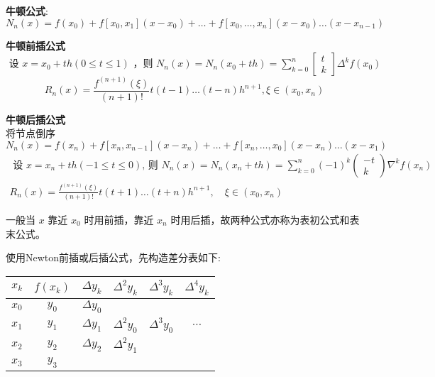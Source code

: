 \textbf{牛顿公式}:\\
$N_{n}(x)=f\left(x_{0}\right)+f\left[x_{0}, x_{1}\right]\left(x-x_{0}\right)+\ldots+f\left[x_{0}, \ldots, x_{n}\right]\left(x-x_{0}\right) \ldots\left(x-x_{n-1}\right)$

\textbf{牛顿前插公式}\\
$
\text { 设 } x=x_{0}+t h(0 \leq t \leq 1) \text { ，则 } N_{n}(x)=N_{n}\left(x_{0}+t h\right)=\sum\limits_{k=0}^{n}\left[\begin{array}{l}
t \\
k
\end{array}\right] \Delta^{k} f\left(x_{0}\right)
$
$$
R_{n}(x)=\frac{f^{(n+1)}(\xi)}{(n+1) !} t(t-1) \ldots(t-n) h^{n+1}, \xi \in\left(x_{0}, x_{n}\right)
$$

\textbf{牛顿后插公式}\\
将节点倒序\\
$N_{n}(x)=f\left(x_{n}\right)+f\left[x_{n}, x_{n-1}\right]\left(x-x_{n}\right)+\ldots+f\left[x_{n}, \ldots, x_{0}\right]\left(x-x_{n}\right) \ldots\left(x-x_{1}\right)$
$$
\begin{gathered}
\text { 设 } x=x_{n}+t h(-1 \leq t \leq 0) \text {, 则 } N_{n}(x)=N_{n}\left(x_{n}+t h\right)=\sum_{k=0}^{n}(-1)^{k}\left(\begin{array}{c}
-t \\
k
\end{array}\right) \nabla^{k} f\left(x_{n}\right) \\
R_{n}(x)=\frac{f^{(n+1)}(\xi)}{(n+1) !} t(t+1) \ldots(t+n) h^{n+1}, \quad \xi \in\left(x_{0}, x_{n}\right)
\end{gathered}
$$

\begin{note}
  一般当 $x$ 靠近 $x_{0}$ 时用前插，靠近 $x_{n}$ 时用后插，故两种公式亦称为表初公式和表末公式。
\end{note}

使用Newton前插或后插公式，先构造差分表如下:
\begin{table}[htbp]
  \centering
  \begin{tabular}{|cccccc|}
    \hline$x_{k}$ & $f\left(x_{k}\right)$ & $\Delta y_{k}$ & $\Delta^{2} y_{k}$ & $\Delta^{3} y_{k}$ & $\Delta^{4} y_{k}$ \\
    \hline$x_{0}$ & $y_{0}$ & $\Delta y_{0}$ & & & \\
    $x_{1}$ & $y_{1}$ & $\Delta y_{1}$ & $\Delta^{2} y_{0}$ & $\Delta^{3} y_{0}$ & $\cdots$ \\
    $x_{2}$ & $y_{2}$ & $\Delta y_{2}$ & $\Delta^{2} y_{1}$ & & \\
    $x_{3}$ & $y_{3}$ & & & & \\
    \hline
  \end{tabular}
\end{table}



